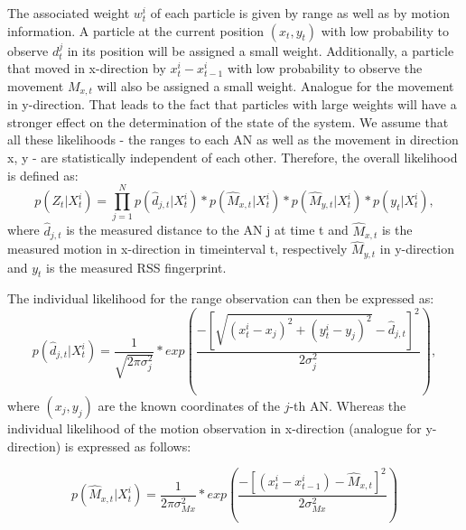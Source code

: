 The associated weight $w^{i}_{t}$ of each particle is given by range as well as by motion information. A particle at the current position $(x_{t},y_{t})$ with low probability to observe $d_{t}^{j}$ in its position will be assigned a small weight. Additionally, a particle that moved in x-direction by $x_{t}^{i}-x_{t-1}^{i}$ with low probability to observe the movement $M_{x,t}$ will also be assigned a small weight. Analogue for the movement in y-direction.
That leads to the fact that particles with large weights will have a stronger effect on the determination of the state of the system.
We assume that all these likelihoods - the ranges to each AN as well as the movement in direction x, y - are statistically independent of each other. Therefore, the overall likelihood is defined as:
\begin{equation}
p(Z_{t} | X^{i}_{t}) = \prod_{j=1}^{N} p(\hat{d}_{j,t}|X_{t}^{i}) * p(\hat{M}_{x,t} | X^{i}_{t}) * p(\hat{M}_{y,t} | X^{i}_{t}) * p(y_t | X^{i}_{t}),
\label{eqn:probability_overall}
\end{equation}
where $\hat{d}_{j,t}$ is the measured distance to the AN j at time t and $\hat{M}_{x,t}$ is the measured motion in x-direction in timeinterval t, respectively $\hat{M}_{y,t}$ in y-direction and $y_t$ is the measured RSS fingerprint.

The individual likelihood for the range observation can then be expressed as:
\begin{equation}
p(\hat{d}_{j,t} | X^{i}_{t}) = \frac{1}{\sqrt{2\pi \sigma_{j}^{2}}} * exp(\frac{-[\sqrt{(x^{i}_{t}-x_{j})^{2}+(y^{i}_{t}-y_{j})^{2}} - \hat{d}_{j,t}]^{2}}{2\sigma_{j}^{2}}),
\label{eqn:probability_individual_distance}
\end{equation}
where $(x_{j},y_{j})$ are the known coordinates of the $j$-th AN.
Whereas the individual likelihood of the motion observation in x-direction (analogue for y-direction) is expressed as follows:

\begin{equation}
p(\hat{M}_{x,t} | X^{i}_{t}) = \frac{1}{2\pi \sigma_{Mx}^{2}} * exp(\frac{-[(x^{i}_{t}-x^{i}_{t-1}) - \hat{M}_{x,t}]^{2}}{2\sigma_{Mx}^{2}})
\label{eqn:probability_individual_movement}
\end{equation}

